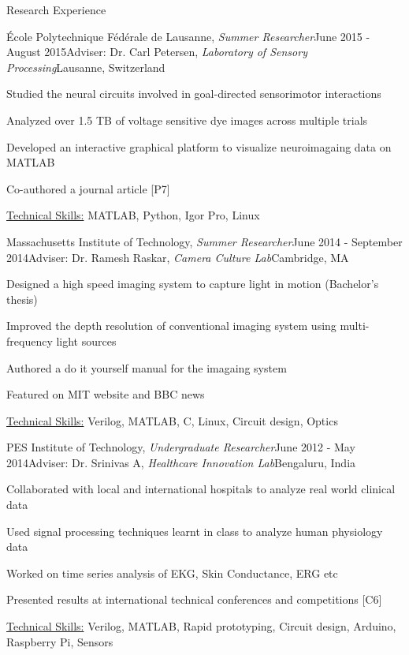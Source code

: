 \documentclass{resume}
\begin{document}
\begin{rSection}{Research Experience}
    \begin{rSubsection}{École Polytechnique Fédérale de Lausanne, \textit{Summer Researcher}}{June 2015 - August 2015}{Adviser: Dr. Carl Petersen, \textit{Laboratory of Sensory Processing}}{Lausanne, Switzerland}
\item Studied the neural circuits involved in goal-directed sensorimotor interactions
\item Analyzed over 1.5 TB of voltage sensitive dye images across multiple trials
\item Developed an interactive graphical platform to visualize neuroimagaing data on MATLAB
\item Co-authored a journal article [P7]
\item \uline{Technical Skills:} MATLAB, Python, Igor Pro, Linux
    \end{rSubsection}
\newpage
    \begin{rSubsection}{Massachusetts Institute of Technology, \textit{Summer Researcher}}{June 2014 - September 2014}{Adviser: Dr. Ramesh Raskar, \textit{Camera Culture Lab}}{Cambridge, MA}
\item Designed a high speed imaging system to capture light in motion (Bachelor's thesis)
\item Improved the depth resolution of conventional imaging system using multi-frequency light sources
\item Authored a do it yourself manual for the imagaing system
\item Featured on MIT website and BBC news
\item \uline{Technical Skills:} Verilog, MATLAB, C, Linux, Circuit design, Optics
    \end{rSubsection}
    
 \begin{rSubsection}{PES Institute of Technology, \textit{Undergraduate Researcher}}{June 2012 - May 2014}{Adviser: Dr. Srinivas A, \textit{Healthcare Innovation Lab}}{Bengaluru, India}
\item Collaborated with local and international hospitals to analyze real world clinical data
\item Used signal processing techniques learnt in class to analyze human physiology data
\item Worked on time series analysis of EKG, Skin Conductance, ERG etc
\item Presented results at international technical conferences and competitions [C6]
\item \uline{Technical Skills:} Verilog, MATLAB, Rapid prototyping, Circuit design, Arduino, Raspberry Pi, Sensors
 \end{rSubsection}
  \end{rSection}
\end{document}
